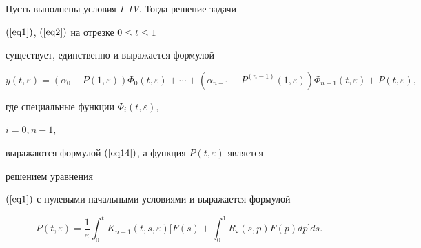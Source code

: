 \begin{thm}


Пусть выполнены условия {\em I--IV}. Тогда решение задачи 


$(\ref{eq1})$, $(\ref{eq2})$ на отрезке $0 \le t \le 1$


существует, единственно и выражается формулой


$$


y(t,\varepsilon ) = (\alpha _{0} - P(1,\varepsilon ))\Phi _{0} 


(t,\varepsilon ) +\dotsb+(\alpha_{n-1} - P^{(n - 1)}(1,\varepsilon ))\Phi 


_{n - 1} (t,\varepsilon ) + P(t,\varepsilon ),


$$


где специальные функции $\Phi _{i} (t,\varepsilon)$,


$i = \overline {0,n - 1}$,


выражаются формулой $(\ref{eq14})$, а функция $P(t,\varepsilon )$ является 


решением уравнения 


$(\ref{eq1})$ с нулевыми начальными условиями и выражается формулой


$$


P(t,\varepsilon ) = {\frac{{1}}{{\varepsilon}} }{\int_{0}^{t} {K_{n - 


1} (t,s,\varepsilon )\bigg[F(s) + {\int_{0}^{1} {R_{\varepsilon}  


(s,p)F(p)dp}} \bigg]ds}}.


$$


\end{thm}





